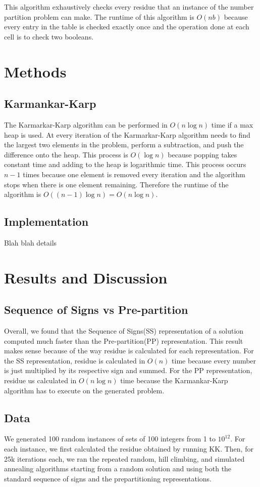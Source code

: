 \documentclass[a4paper]{article}
\begin{document}
	This algorithm exhaustively checks every residue that an instance of the number partition problem can make. The runtime of this algorithm is $O(nb)$ because every entry in the table is checked exactly once and the operation done at each cell is to check two booleans.
	
	\section{Methods}
	\subsection{Karmankar-Karp}
	The Karmarkar-Karp algorithm can be performed in $O(n\log n)$ time if a max heap is used. At every iteration of the Karmarkar-Karp algorithm needs to find the largest two elements in the problem, perform a subtraction, and push the difference onto the heap. This process is $O(\log n)$ because popping takes constant time and adding to the heap is logarithmic time. This process occurs $n-1$ times because one element is removed every iteration and the algorithm stops when there is one element remaining. Therefore the runtime of the algorithm is $O((n-1) \log n) = O(n\log n)$.
	\subsection{Implementation}
	Blah blah details
	
	\section{Results and Discussion}
	\subsection{Sequence of Signs vs Pre-partition}
	Overall, we found that the Sequence of Signs(SS) representation of a solution computed much faster than the Pre-partition(PP) representation. This result makes sense because of the way residue is calculated for each representation. For the SS representation, residue is calculated in $O(n)$ time because every number is just multiplied by its respective sign and summed. For the PP representation, residue us calculated in $O(n\log n)$ time because the Karmankar-Karp algorithm has to execute on the generated problem.
	
	\subsection{Data}
	We generated 100 random instances of sets of 100 integers from 1 to $10^12$. For each instance, we first calculated the residue obtained by running KK. Then, for 25k iterations each, we ran the repeated random, hill climbing, and simulated annealing algorithms starting from a random solution and using both the standard sequence of signs and the prepartitioning representations. 
	
\end{document}
